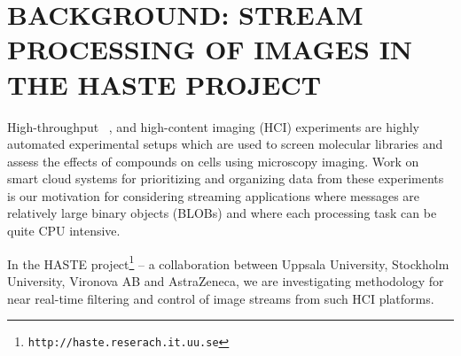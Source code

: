 \documentclass[letterpaper,conference]{IEEEtran}
\begin{document}
\section{BACKGROUND: STREAM PROCESSING OF IMAGES IN THE HASTE PROJECT}\label{background}


High-throughput ~\cite{wollmanHighThroughputMicroscopy2007}, and high-content imaging (HCI) experiments are highly automated experimental setups which are used to screen molecular libraries and assess the effects of compounds on cells using microscopy imaging. Work on smart cloud systems for prioritizing and organizing data from these experiments is our motivation for considering streaming applications where messages are relatively large binary objects (BLOBs) and where each processing task can be quite CPU intensive.

In the HASTE project\footnote{\texttt{http://haste.reserach.it.uu.se}} -- a collaboration between Uppsala University, Stockholm University, Vironova AB and AstraZeneca, we are investigating methodology for near real-time filtering and control of image streams from such HCI platforms. 
\end{document}
